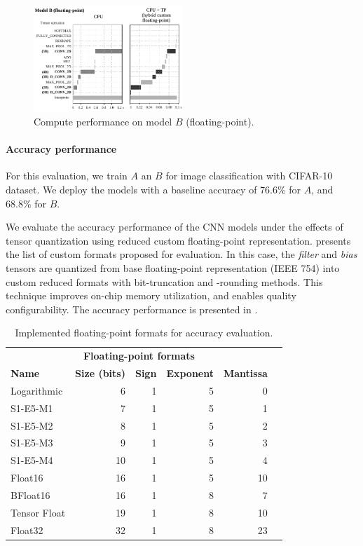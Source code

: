 \begin{figure}[t!]
	\centering
	\includegraphics[width=0.5\textwidth]{../figures/sched_B_float.pdf}
	\caption{Compute performance on model $B$ (floating-point).}
	\label{fig:sched_model_b_float}
\end{figure}

\paragraph{Accuracy performance}

For this evaluation, we train $A$ an $B$ for image classification with CIFAR-10 dataset. We deploy the models with a baseline accuracy of 76.6\% for $A$, and 68.8\% for $B$.

We evaluate the accuracy performance of the CNN models under the effects of tensor quantization using reduced custom floating-point representation.  presents the list of custom formats proposed for evaluation. In this case, the \emph{filter} and \emph{bias} tensors are quantized from base floating-point representation (IEEE 754) into custom reduced formats with bit-truncation and -rounding methods. This technique improves on-chip memory utilization, and enables quality configurability. The accuracy performance is presented in .

\begin{table}[!htp]\centering
	\caption{Implemented floating-point formats for accuracy evaluation.}\label{tab:formats}
	\scriptsize
	\begin{tabular}{lrrrrr}\toprule
		\multicolumn{5}{c}{\textbf{Floating-point formats}} \\\cmidrule{1-5}
		\textbf{Name} &\textbf{Size (bits)} &\textbf{Sign} &\textbf{Exponent} &\textbf{Mantissa} \\\midrule
		Logarithmic &6 &1 &5 &0 \\
		S1-E5-M1 &7 &1 &5 &1 \\
		S1-E5-M2 &8 &1 &5 &2 \\
		S1-E5-M3 &9 &1 &5 &3 \\
		S1-E5-M4 &10 &1 &5 &4 \\
		Float16 &16 &1 &5 &10 \\
		BFloat16 &16 &1 &8 &7 \\
		Tensor Float &19 &1 &8 &10 \\
		Float32 &32 &1 &8 &23 \\
		\bottomrule
	\end{tabular}
\end{table}

